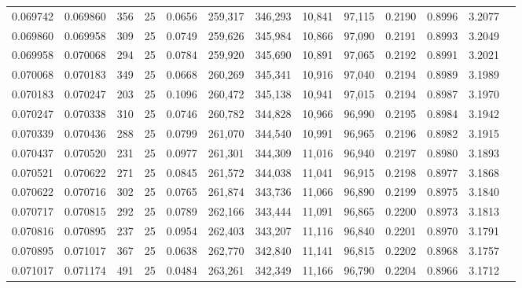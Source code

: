 \begin{tabular}{rrrrrrrrrrrrr}
0.069742 & 0.069860 &   356 &  25 &                                     0.0656 & 259,317 & 346,293 &  10,841 &  97,115 & 0.2190 & 0.8996 & 3.2077 \\
0.069860 & 0.069958 &   309 &  25 &                                     0.0749 & 259,626 & 345,984 &  10,866 &  97,090 & 0.2191 & 0.8993 & 3.2049 \\
0.069958 & 0.070068 &   294 &  25 &                                     0.0784 & 259,920 & 345,690 &  10,891 &  97,065 & 0.2192 & 0.8991 & 3.2021 \\
0.070068 & 0.070183 &   349 &  25 &                                     0.0668 & 260,269 & 345,341 &  10,916 &  97,040 & 0.2194 & 0.8989 & 3.1989 \\
0.070183 & 0.070247 &   203 &  25 &                                     0.1096 & 260,472 & 345,138 &  10,941 &  97,015 & 0.2194 & 0.8987 & 3.1970 \\
0.070247 & 0.070338 &   310 &  25 &                                     0.0746 & 260,782 & 344,828 &  10,966 &  96,990 & 0.2195 & 0.8984 & 3.1942 \\
0.070339 & 0.070436 &   288 &  25 &                                     0.0799 & 261,070 & 344,540 &  10,991 &  96,965 & 0.2196 & 0.8982 & 3.1915 \\
0.070437 & 0.070520 &   231 &  25 &                                     0.0977 & 261,301 & 344,309 &  11,016 &  96,940 & 0.2197 & 0.8980 & 3.1893 \\
0.070521 & 0.070622 &   271 &  25 &                                     0.0845 & 261,572 & 344,038 &  11,041 &  96,915 & 0.2198 & 0.8977 & 3.1868 \\
0.070622 & 0.070716 &   302 &  25 &                                     0.0765 & 261,874 & 343,736 &  11,066 &  96,890 & 0.2199 & 0.8975 & 3.1840 \\
0.070717 & 0.070815 &   292 &  25 &                                     0.0789 & 262,166 & 343,444 &  11,091 &  96,865 & 0.2200 & 0.8973 & 3.1813 \\
0.070816 & 0.070895 &   237 &  25 &                                     0.0954 & 262,403 & 343,207 &  11,116 &  96,840 & 0.2201 & 0.8970 & 3.1791 \\
0.070895 & 0.071017 &   367 &  25 &                                     0.0638 & 262,770 & 342,840 &  11,141 &  96,815 & 0.2202 & 0.8968 & 3.1757 \\
0.071017 & 0.071174 &   491 &  25 &                                     0.0484 & 263,261 & 342,349 &  11,166 &  96,790 & 0.2204 & 0.8966 & 3.1712 \\

\end{tabular}
